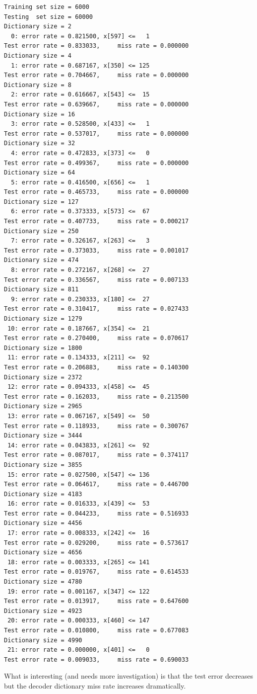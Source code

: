 \documentclass{article}
\begin{document}
\begin{verbatim}
Training set size = 6000
Testing  set size = 60000
Dictionary size = 2
  0: error rate = 0.821500, x[597] <=   1
Test error rate = 0.833033, 	miss rate = 0.000000
Dictionary size = 4
  1: error rate = 0.687167, x[350] <= 125
Test error rate = 0.704667, 	miss rate = 0.000000
Dictionary size = 8
  2: error rate = 0.616667, x[543] <=  15
Test error rate = 0.639667, 	miss rate = 0.000000
Dictionary size = 16
  3: error rate = 0.528500, x[433] <=   1
Test error rate = 0.537017, 	miss rate = 0.000000
Dictionary size = 32
  4: error rate = 0.472833, x[373] <=   0
Test error rate = 0.499367, 	miss rate = 0.000000
Dictionary size = 64
  5: error rate = 0.416500, x[656] <=   1
Test error rate = 0.465733, 	miss rate = 0.000000
Dictionary size = 127
  6: error rate = 0.373333, x[573] <=  67
Test error rate = 0.407733, 	miss rate = 0.000217
Dictionary size = 250
  7: error rate = 0.326167, x[263] <=   3
Test error rate = 0.373033, 	miss rate = 0.001017
Dictionary size = 474
  8: error rate = 0.272167, x[268] <=  27
Test error rate = 0.336567, 	miss rate = 0.007133
Dictionary size = 811
  9: error rate = 0.230333, x[180] <=  27
Test error rate = 0.310417, 	miss rate = 0.027433
Dictionary size = 1279
 10: error rate = 0.187667, x[354] <=  21
Test error rate = 0.270400, 	miss rate = 0.070617
Dictionary size = 1800
 11: error rate = 0.134333, x[211] <=  92
Test error rate = 0.206883, 	miss rate = 0.140300
Dictionary size = 2372
 12: error rate = 0.094333, x[458] <=  45
Test error rate = 0.162033, 	miss rate = 0.213500
Dictionary size = 2965
 13: error rate = 0.067167, x[549] <=  50
Test error rate = 0.118933, 	miss rate = 0.300767
Dictionary size = 3444
 14: error rate = 0.043833, x[261] <=  92
Test error rate = 0.087017, 	miss rate = 0.374117
Dictionary size = 3855
 15: error rate = 0.027500, x[547] <= 136
Test error rate = 0.064617, 	miss rate = 0.446700
Dictionary size = 4183
 16: error rate = 0.016333, x[439] <=  53
Test error rate = 0.044233, 	miss rate = 0.516933
Dictionary size = 4456
 17: error rate = 0.008333, x[242] <=  16
Test error rate = 0.029200, 	miss rate = 0.573617
Dictionary size = 4656
 18: error rate = 0.003333, x[265] <= 141
Test error rate = 0.019767, 	miss rate = 0.614533
Dictionary size = 4780
 19: error rate = 0.001167, x[347] <= 122
Test error rate = 0.013917, 	miss rate = 0.647600
Dictionary size = 4923
 20: error rate = 0.000333, x[460] <= 147
Test error rate = 0.010800, 	miss rate = 0.677083
Dictionary size = 4990
 21: error rate = 0.000000, x[401] <=   0
Test error rate = 0.009033, 	miss rate = 0.690033
\end{verbatim}
What is interesting (and needs more investigation) is that the test error decreases but the decoder dictionary miss rate increases dramatically.
\end{document}
